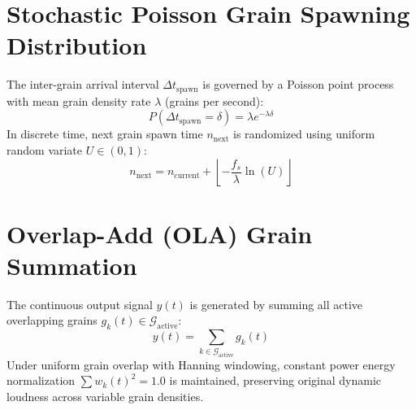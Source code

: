 \documentclass[11pt,a4paper]{article}
\begin{document}
\section{Stochastic Poisson Grain Spawning Distribution}
The inter-grain arrival interval $\Delta t_{\text{spawn}}$ is governed by a Poisson point process with mean grain density rate $\lambda$ (grains per second):
\begin{equation}
P(\Delta t_{\text{spawn}} = \delta) = \lambda e^{-\lambda \delta}
\end{equation}
In discrete time, next grain spawn time $n_{\text{next}}$ is randomized using uniform random variate $U \in (0, 1)$:
\begin{equation}
n_{\text{next}} = n_{\text{current}} + \left\lfloor -\frac{f_s}{\lambda} \ln(U) \right\rfloor
\end{equation}

\section{Overlap-Add (OLA) Grain Summation}
The continuous output signal $y(t)$ is generated by summing all active overlapping grains $g_k(t) \in \mathcal{G}_{\text{active}}$:
\begin{equation}
y(t) = \sum_{k \in \mathcal{G}_{\text{active}}} g_k(t)
\end{equation}
Under uniform grain overlap with Hanning windowing, constant power energy normalization $\sum w_k(t)^2 = 1.0$ is maintained, preserving original dynamic loudness across variable grain densities.
\end{document}
